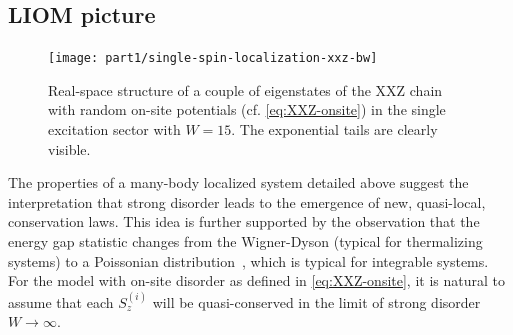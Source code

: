 %

\subsection{LIOM picture}

\begin{figure}[h!]
	\centering
	\texttt{[image: part1/single-spin-localization-xxz-bw]}
	\caption{Real-space structure of a couple of eigenstates of the XXZ chain with random on-site potentials (cf. \autoref{eq:XXZ-onsite}) in the single excitation sector with $W=15$. The exponential tails are clearly visible.}
	\label{fig:xxz-singlespin-exponential-tails}
\end{figure}

The properties of a many-body localized system detailed above suggest the interpretation that strong disorder leads to the emergence of new, quasi-local, conservation laws.
This idea is further supported by the observation that the energy gap statistic changes from the Wigner-Dyson (typical for thermalizing systems) to a Poissonian distribution~\cite{oganesyanLocalizationInteractingFermions2007}, which is typical for integrable systems. For the model with on-site disorder as defined in \autoref{eq:XXZ-onsite}, it is natural to assume that each $S_z^{(i)}$ will be quasi-conserved in the limit of strong disorder $W\rightarrow\infty$.

